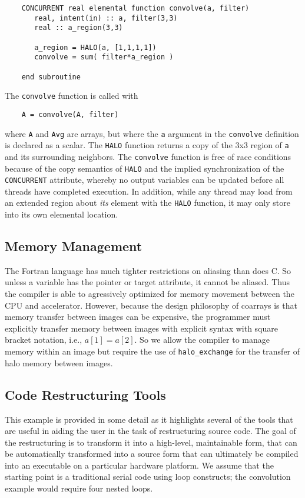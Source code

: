 \begin{verbatim}
    CONCURRENT real elemental function convolve(a, filter)
       real, intent(in) :: a, filter(3,3)
       real :: a_region(3,3)

       a_region = HALO(a, [1,1,1,1])
       convolve = sum( filter*a_region )

    end subroutine
\end{verbatim}

The {\tt convolve} function is called with
\begin{verbatim}
    A = convolve(A, filter)
\end{verbatim}
where {\tt A} and {\tt Avg} are arrays, but where the {\tt a} argument in the
{\tt convolve} definition is declared as a scalar.  The {\tt HALO} function
returns a copy of the 3x3 region of {\tt a} and its surrounding neighbors.  The
{\tt convolve} function is free of race conditions because of the copy semantics
of {\tt HALO} and the implied synchronization of the {\tt CONCURRENT} attribute,
whereby no output variables can be updated before all threads have completed
execution.  In addition, while any thread may load from an extended region
about \emph{its} element with the {\tt HALO} function, it may only store into
its own elemental location.

\subsection{Memory Management}

The Fortran language has much tighter restrictions on aliasing than does C.
So unless a variable has the pointer or target attribute, it cannot be aliased.
Thus the compiler is able to agressively optimized for memory movement between
the CPU and accelerator.  However, because the design philosophy of coarrays
is that memory transfer between images can be expensive, the programmer must
explicitly transfer memory between images with explicit syntax with square
bracket notation, i.e., $a[1] = a[2]$.  So we allow the compiler to manage
memory within an image but require the use of {\tt halo_exchange} for the
transfer of halo memory between images.

\subsection{Code Restructuring Tools}

This example is provided in some detail as it highlights several of the tools
that are useful in aiding the user in the task of restructuring source code.
The goal of the restructuring is to transform it into a high-level, maintainable
form, that can be automatically transformed into a source form that can
ultimately be compiled into an executable on a particular hardware platform.  We
assume that the starting point is a traditional serial code using loop
constructs; the convolution example would require four nested loops.

